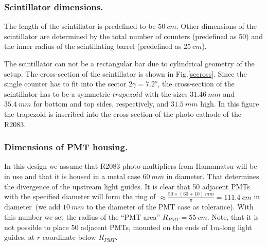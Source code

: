 \subsubsection{Scintillator dimensions.}

The length of the scintillator is predefined to be $50~cm$.
Other dimensions  of the scintillator are determined by 
the total number of counters (predefined as 50) 
 and the inner radius of the scintillating barrel (predefined as $25~cm$).

The scintillator can not be a rectangular bar due to cylindrical 
geometry of the setup.
The  cross-section of the scintillator
is shown in Fig.\ref{sccross}. 
Since the single counter has to fit into the sector $2\gamma=7.2^o$,
 the   cross-section of the scintillator  has to be 
 a symmetric $trapezoid$ with the sizes 
 $31.46~mm$ and $35.4~mm$ for bottom and top sides, respectively,  
and  $31.5~mm$ high.
In this figure the trapezoid is inscribed into the  
cross section of the 
photo-cathode of the R2083.  


%
%
%


\subsubsection{Dimensions of PMT housing.}
In this design we  assume that  R2083 photo-multipliers 
from Hamamatsu will be in use and that it 
is housed in a metal case  $60~mm$ in diameter.
 That determines the divergence of  the upstream light guides. 
It is clear that 50  adjacent PMTs with the specified diameter
 will form the ring of $\approx\frac{50\times (60+10)~mm}{\pi}=111.4~cm$ 
in diameter~(we  add $10~mm$ to the diameter of the PMT case as 
tolerance).
With this number we set the radius of  the ``PMT area'' $R_{PMT}=55~cm$.
Note, that it  is not possible to  place 
50 adjacent  PMTs, mounted on the ends of $1m$-long light guides, 
at  $r$-coordinate below $R_{PMT}$. 

